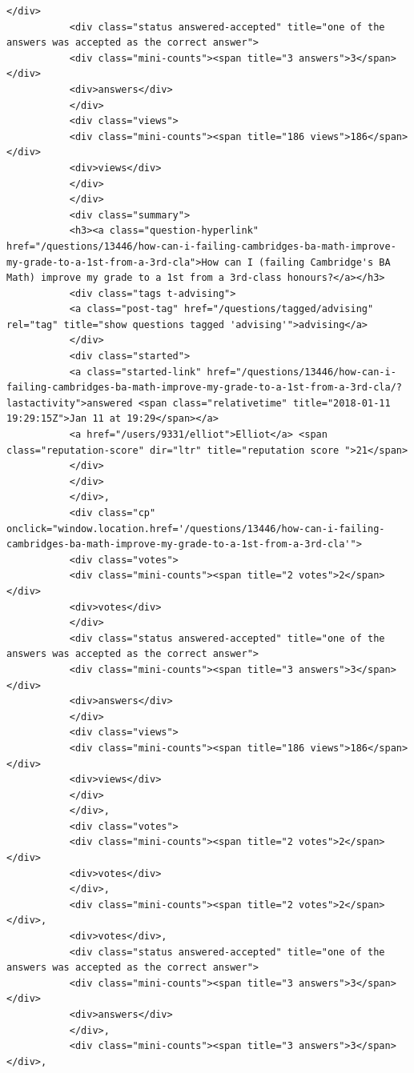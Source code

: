 \documentclass[11pt]{article}
\begin{document}
\begin{Verbatim}[commandchars=\\\{\}]
           </div>
           <div class="status answered-accepted" title="one of the answers was accepted as the correct answer">
           <div class="mini-counts"><span title="3 answers">3</span></div>
           <div>answers</div>
           </div>
           <div class="views">
           <div class="mini-counts"><span title="186 views">186</span></div>
           <div>views</div>
           </div>
           </div>
           <div class="summary">
           <h3><a class="question-hyperlink" href="/questions/13446/how-can-i-failing-cambridges-ba-math-improve-my-grade-to-a-1st-from-a-3rd-cla">How can I (failing Cambridge's BA Math) improve my grade to a 1st from a 3rd-class honours?</a></h3>
           <div class="tags t-advising">
           <a class="post-tag" href="/questions/tagged/advising" rel="tag" title="show questions tagged 'advising'">advising</a>
           </div>
           <div class="started">
           <a class="started-link" href="/questions/13446/how-can-i-failing-cambridges-ba-math-improve-my-grade-to-a-1st-from-a-3rd-cla/?lastactivity">answered <span class="relativetime" title="2018-01-11 19:29:15Z">Jan 11 at 19:29</span></a>
           <a href="/users/9331/elliot">Elliot</a> <span class="reputation-score" dir="ltr" title="reputation score ">21</span>
           </div>
           </div>
           </div>,
           <div class="cp" onclick="window.location.href='/questions/13446/how-can-i-failing-cambridges-ba-math-improve-my-grade-to-a-1st-from-a-3rd-cla'">
           <div class="votes">
           <div class="mini-counts"><span title="2 votes">2</span></div>
           <div>votes</div>
           </div>
           <div class="status answered-accepted" title="one of the answers was accepted as the correct answer">
           <div class="mini-counts"><span title="3 answers">3</span></div>
           <div>answers</div>
           </div>
           <div class="views">
           <div class="mini-counts"><span title="186 views">186</span></div>
           <div>views</div>
           </div>
           </div>,
           <div class="votes">
           <div class="mini-counts"><span title="2 votes">2</span></div>
           <div>votes</div>
           </div>,
           <div class="mini-counts"><span title="2 votes">2</span></div>,
           <div>votes</div>,
           <div class="status answered-accepted" title="one of the answers was accepted as the correct answer">
           <div class="mini-counts"><span title="3 answers">3</span></div>
           <div>answers</div>
           </div>,
           <div class="mini-counts"><span title="3 answers">3</span></div>,

\end{Verbatim}
\end{document}

